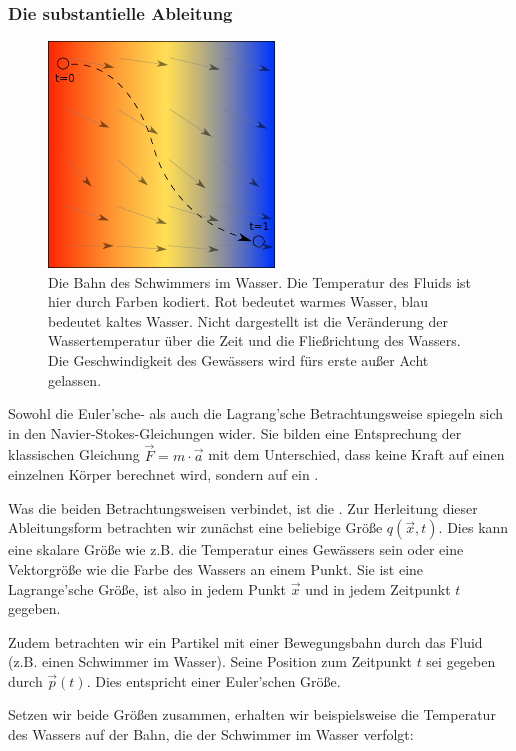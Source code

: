 \subsubsection{Die substantielle Ableitung}

\begin{figure}[ht]
\includegraphics[width=6cm]{images/swimmer_in_water}
\caption{Die Bahn des Schwimmers im Wasser. Die Temperatur des Fluids ist hier durch Farben kodiert. Rot bedeutet warmes Wasser, blau bedeutet kaltes Wasser. Nicht dargestellt ist die Veränderung der Wassertemperatur über die Zeit und die Fließrichtung des Wassers. Die Geschwindigkeit des Gewässers wird fürs erste außer Acht gelassen.}
\end{figure}

Sowohl die Euler'sche- als auch die Lagrang'sche Betrachtungsweise spiegeln sich
in den Navier-Stokes-Gleichungen wider. Sie bilden eine Entsprechung der
klassischen Gleichung $\vec{F} = m \cdot \vec{a}$ mit dem Unterschied, dass
keine Kraft auf einen einzelnen Körper berechnet wird, sondern auf ein
.

Was die beiden Betrachtungsweisen verbindet, ist die
. Zur Herleitung dieser Ableitungsform
betrachten wir zunächst eine beliebige Größe $q(\vec{x},t)$. Dies kann eine
skalare Größe wie z.B. die Temperatur eines Gewässers sein oder eine Vektorgröße
wie die Farbe des Wassers an einem Punkt. Sie ist eine Lagrange'sche Größe, ist
also in jedem Punkt $\vec{x}$ und in jedem Zeitpunkt $t$ gegeben.

Zudem betrachten wir ein Partikel mit einer Bewegungsbahn durch das Fluid (z.B.
einen Schwimmer im Wasser). Seine Position zum Zeitpunkt $t$ sei gegeben durch
$\vec{p}(t)$. Dies entspricht einer Euler'schen Größe.

Setzen wir beide Größen zusammen, erhalten wir beispielsweise die Temperatur des
Wassers auf der Bahn, die der Schwimmer im Wasser verfolgt:

